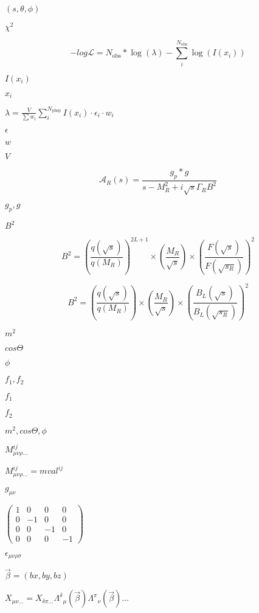\documentclass{article}
\begin{document}
$(s,\theta,\phi)$
\pagebreak

$\chi^{2}$
\pagebreak

\[ -log \mathcal{L} = N_{\mathrm{obs}} * \log(\lambda) - \sum_i^{N_{\mathrm{obs}}} \log(I(x_i)) \]
\pagebreak

$I(x_i)$
\pagebreak

$x_i$
\pagebreak

$ \lambda = \frac{V}{\sum w_i}\sum_i^{N_{\mathrm{phsp}}} I(x_i)\cdot \epsilon_i \cdot w_i $
\pagebreak

$ \epsilon $
\pagebreak

$ w $
\pagebreak

$ V $
\pagebreak

\[ \mathcal{A}_R(s) = \frac{g_p*g}{s - M_R^2 + i \sqrt{s} \Gamma_R B^2} \]
\pagebreak

$ g_p, g$
\pagebreak

$ B^2$
\pagebreak

\[ B^2 = \left( \frac{q(\sqrt{s})}{q(M_R)} \right)^{2L+1} \times \left( \frac{M_R}{\sqrt{s}} \right) \times \left( \frac{F(\sqrt{s})}{F(\sqrt{s_R})} \right)^{2} \]
\pagebreak

\[ B^2 = \left( \frac{q(\sqrt{s})}{q(M_R)} \right) \times \left( \frac{M_R}{\sqrt{s}} \right) \times \left( \frac{B_L(\sqrt{s})}{B_L(\sqrt{s_R})} \right)^{2} \]
\pagebreak

$m^2$
\pagebreak

$cos\Theta$
\pagebreak

$\phi$
\pagebreak

$f_1,f_2$
\pagebreak

$f_1$
\pagebreak

$f_2$
\pagebreak

$m^2, cos\Theta, \phi$
\pagebreak

$ M^{ij}_{\mu\nu\rho\ldots} $
\pagebreak

$ M^{ij}_{\mu\nu\rho\ldots} = mval^{ij} $
\pagebreak

$ g_{\mu\nu} $
\pagebreak

$ \left(\begin{array}{cccc} 1&0&0&0\\0&-1&0&0\\0&0&-1&0\\0&0&0&-1 \end{array}\right) $
\pagebreak

$\epsilon_{\mu\nu\rho\sigma}$
\pagebreak

$\vec{\beta}=(bx,by,bz)$
\pagebreak

$ X_{\mu\nu\ldots} = X_{\delta\pi\ldots} \Lambda^{\delta}{}_{\mu}(\vec{\beta})\Lambda^{\pi}{}_{\nu}(\vec{\beta}) \ldots $
\pagebreak
\end{document}
